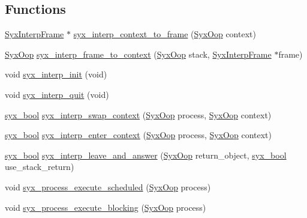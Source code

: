 \subsection*{Functions}
\begin{CompactItemize}
\item 
\hyperlink{struct_syx_interp_frame}{SyxInterpFrame} $\ast$ \hyperlink{syx-interp_8c_2fe6a5f292ce5d9ab3103878b6d3d7cf}{syx\_\-interp\_\-context\_\-to\_\-frame} (\hyperlink{syx-types_8h_1121caba2d40b2ce090b640762744ccd}{SyxOop} context)
\item 
\hyperlink{syx-types_8h_1121caba2d40b2ce090b640762744ccd}{SyxOop} \hyperlink{syx-interp_8c_f8844c877ec9281208ea602d73880c0f}{syx\_\-interp\_\-frame\_\-to\_\-context} (\hyperlink{syx-types_8h_1121caba2d40b2ce090b640762744ccd}{SyxOop} stack, \hyperlink{struct_syx_interp_frame}{SyxInterpFrame} $\ast$frame)
\item 
void \hyperlink{syx-interp_8c_74bb3b8c0b72fcd2b2d2c7c7bba5f5e2}{syx\_\-interp\_\-init} (void)
\item 
void \hyperlink{syx-interp_8c_41a4fa9a3836e8750667a4134b60835f}{syx\_\-interp\_\-quit} (void)
\item 
\hyperlink{syx-types_8h_c6dc09b276b99fa1956364359139daab}{syx\_\-bool} \hyperlink{syx-interp_8c_67ca91c8a692283098cb5b9c1da4f7ab}{syx\_\-interp\_\-swap\_\-context} (\hyperlink{syx-types_8h_1121caba2d40b2ce090b640762744ccd}{SyxOop} process, \hyperlink{syx-types_8h_1121caba2d40b2ce090b640762744ccd}{SyxOop} context)
\item 
\hyperlink{syx-types_8h_c6dc09b276b99fa1956364359139daab}{syx\_\-bool} \hyperlink{syx-interp_8c_e483ac8c92a367fc44460969715106d9}{syx\_\-interp\_\-enter\_\-context} (\hyperlink{syx-types_8h_1121caba2d40b2ce090b640762744ccd}{SyxOop} process, \hyperlink{syx-types_8h_1121caba2d40b2ce090b640762744ccd}{SyxOop} context)
\item 
\hyperlink{syx-types_8h_c6dc09b276b99fa1956364359139daab}{syx\_\-bool} \hyperlink{syx-interp_8c_0c2ace1d18e0f3649ca19345bb5a89d5}{syx\_\-interp\_\-leave\_\-and\_\-answer} (\hyperlink{syx-types_8h_1121caba2d40b2ce090b640762744ccd}{SyxOop} return\_\-object, \hyperlink{syx-types_8h_c6dc09b276b99fa1956364359139daab}{syx\_\-bool} use\_\-stack\_\-return)
\item 
void \hyperlink{syx-interp_8c_86764c60b013f2d11406a06ef5703735}{syx\_\-process\_\-execute\_\-scheduled} (\hyperlink{syx-types_8h_1121caba2d40b2ce090b640762744ccd}{SyxOop} process)
\item 
void \hyperlink{syx-interp_8c_34287a6590d55ee7225b0437a73609b0}{syx\_\-process\_\-execute\_\-blocking} (\hyperlink{syx-types_8h_1121caba2d40b2ce090b640762744ccd}{SyxOop} process)
\end{CompactItemize}


